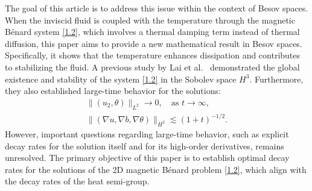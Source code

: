 \documentclass[10pt,a4paper]{amsart}
\numberwithin{equation}{section}
\begin{document}
 The goal of this article is to address this issue within the context of Besov spaces.
When the inviscid fluid is coupled with the temperature through the magnetic B\'enard system
\eqref{1.2}, which involves a thermal damping term instead of thermal diffusion, this paper aims to
provide a new mathematical result in Besov spaces. Specifically, it shows that the temperature
enhances dissipation and contributes to stabilizing the fluid. A previous study by Lai et al.\
\cite{MR4790886} demonstrated the global existence and stability of the system \eqref{1.2} in the
Sobolev space $H^3$. Furthermore, they also established large-time behavior for the solutions:
\begin{equation} \label{1.1.1}
\begin{aligned}
 \|(u_2,\theta)\|_{L^2}\to 0,\quad\text{as } t\to\infty, \\
 \|(\nabla u,\nabla b,\nabla\theta)\|_{H^2}\lesssim(1+t) ^{-1/2}.
\end{aligned}
\end{equation}
However, important questions regarding large-time behavior, such as explicit decay rates for the
solution itself and for its high-order derivatives, remains unresolved.
The primary objective of this paper is to establish optimal decay rates for the solutions of the 2D
magnetic B\'enard problem \eqref{1.2}, which align with the decay rates of the heat semi-group.
\end{document}
